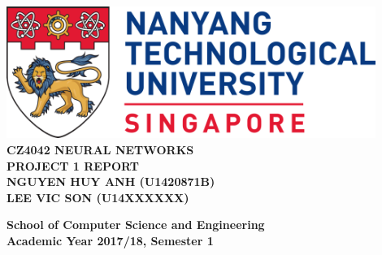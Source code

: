 \documentclass[11pt]{report}
\begin{document}
\begin{titlepage}
    \begin{center}
    
    \includegraphics[width=0.9\textwidth]{images/ntu_logo.png}
    \\[6cm]
    
    \uppercase{
    \textbf{CZ4042 Neural Networks}\\
    \textbf{Project 1 Report}
    \\[3cm]
    \textbf{Nguyen Huy Anh (U1420871B)}\\
    \textbf{Lee Vic Son (U14XXXXXX)}
    }
    
    \vfill
    
    \textbf{School of Computer Science and Engineering}
    \\
    \textbf{Academic Year 2017/18, Semester 1}
    
    \end{center}
\end{titlepage}

\end{document}

